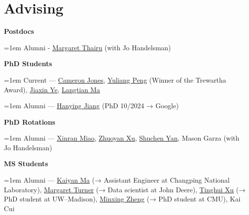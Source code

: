 \documentclass[letterpaper]{article}
\renewenvironment{itemize}{
  \begin{list}{}{
    \setlength{\leftmargin}{1.5em}
  }
}{
  \end{list}
}
\begin{document}
\section*{Advising}
\begin{itemize}
    \item \textbf{Postdocs}\\
    {\hangindent=1em \noindent\hspace*{1em}Alumni - \href{https://wid.wisc.edu/people/margaret-thairu/}{Margaret Thairu} (with Jo Handelsman)\par}

    \item \textbf{PhD Students}\\
    {\hangindent=1em \noindent\hspace*{1em}Current —
    \href{https://stat.wisc.edu/staff/jones-cameron/}{Cameron Jones},
    \href{https://stat.wisc.edu/staff/peng-yuliang/}{Yuliang Peng} (Winner of the Trewartha Award),
    \href{https://jiaxin-yeah.github.io/}{Jiaxin Ye},
    \href{https://langtianm.github.io/}{Langtian Ma}\par}
    \vspace{0.3ex}
    {\hangindent=1em \noindent\hspace*{1em}Alumni — \href{https://www.linkedin.com/in/hanying-jiang-496b091b4}{Hanying Jiang} (PhD 10/2024 → Google)\par}

    \item \textbf{PhD Rotations}\\
    {\hangindent=1em \noindent\hspace*{1em}Alumni —
    \href{https://xinranmiao.github.io/}{Xinran Miao},
    \href{https://pages.cs.wisc.edu/~zxu444/home/}{Zhuoyan Xu},
    \href{https://stat.wisc.edu/staff/yan-shuchen/}{Shuchen Yan},
    Mason Garza (with Jo Handelsman)\par}

    \item \textbf{MS Students}\\
    {\hangindent=1em \noindent\hspace*{1em}Alumni —
    \href{https://kaiyanm.github.io/}{Kaiyan Ma} (→ Assistant Engineer at Changping National Laboratory),
    \href{https://www.linkedin.com/in/margaret-l-turner}{Margaret Turner} (→ Data scientist at John Deere),
    \href{https://biostat.wiscweb.wisc.edu/staff/xu-tinghui}{Tinghui Xu} (→ PhD student at UW–Madison),
    \href{https://minxing-zheng.github.io/}{Minxing Zheng} (→ PhD student at CMU), Kai Cui\par}


\end{itemize}
\end{document}
